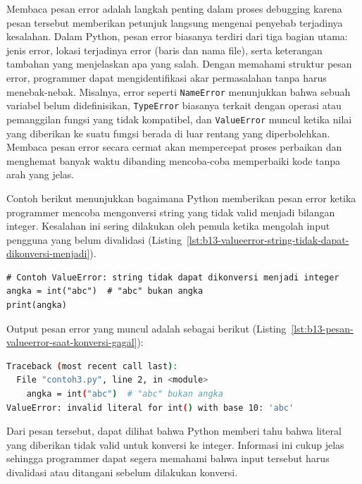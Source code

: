 Membaca pesan error adalah langkah penting dalam proses debugging karena pesan tersebut memberikan petunjuk langsung mengenai penyebab terjadinya kesalahan. Dalam Python, pesan error biasanya terdiri dari tiga bagian utama: jenis error, lokasi terjadinya error (baris dan nama file), serta keterangan tambahan yang menjelaskan apa yang salah. Dengan memahami struktur pesan error, programmer dapat mengidentifikasi akar permasalahan tanpa harus menebak-nebak. Misalnya, error seperti \texttt{NameError} menunjukkan bahwa sebuah variabel belum didefinisikan, \texttt{TypeError} biasanya terkait dengan operasi atau pemanggilan fungsi yang tidak kompatibel, dan \texttt{ValueError} muncul ketika nilai yang diberikan ke suatu fungsi berada di luar rentang yang diperbolehkan. Membaca pesan error secara cermat akan mempercepat proses perbaikan dan menghemat banyak waktu dibanding mencoba-coba memperbaiki kode tanpa arah yang jelas.

Contoh berikut menunjukkan bagaimana Python memberikan pesan error ketika programmer mencoba mengonversi string yang tidak valid menjadi bilangan integer. Kesalahan ini sering dilakukan oleh pemula ketika mengolah input pengguna yang belum divalidasi (Listing~\ref{lst:b13-valueerror-string-tidak-dapat-dikonversi-menjadi}).

\begin{lstlisting}[style=PythonStyle, caption={Contoh ValueError: string tidak dapat dikonversi menjadi integer}, label={lst:b13-valueerror-string-tidak-dapat-dikonversi-menjadi}]
# Contoh ValueError: string tidak dapat dikonversi menjadi integer
angka = int("abc")  # "abc" bukan angka
print(angka)
\end{lstlisting}

Output pesan error yang muncul adalah sebagai berikut (Listing~\ref{lst:b13-pesan-valueerror-saat-konversi-gagal}):

\begin{lstlisting}[language=bash, caption={Pesan ValueError saat konversi gagal}, label={lst:b13-pesan-valueerror-saat-konversi-gagal}]
Traceback (most recent call last):
  File "contoh3.py", line 2, in <module>
    angka = int("abc")  # "abc" bukan angka
ValueError: invalid literal for int() with base 10: 'abc'
\end{lstlisting}

Dari pesan tersebut, dapat dilihat bahwa Python memberi tahu bahwa literal yang diberikan tidak valid untuk konversi ke integer. Informasi ini cukup jelas sehingga programmer dapat segera memahami bahwa input tersebut harus divalidasi atau ditangani sebelum dilakukan konversi.

